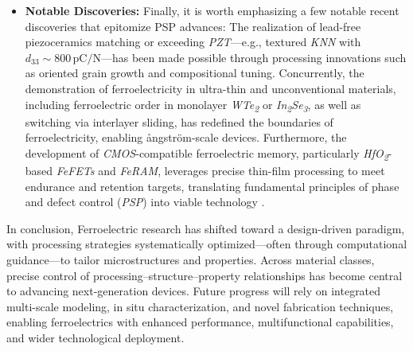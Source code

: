 \documentclass[a4paper,fleqn]{cas-sc}
\begin{document}
\begin{itemize}
\item \textbf{Notable Discoveries:} Finally, it is worth emphasizing a few notable recent discoveries that epitomize PSP advances: The realization of lead-free piezoceramics matching or exceeding \textit{PZT}—e.g., textured \textit{KNN} with $d_{33} \sim 800\,\text{pC/N}$—has been made possible through processing innovations such as oriented grain growth and compositional tuning. Concurrently, the demonstration of ferroelectricity in ultra-thin and unconventional materials, including ferroelectric order in monolayer \textit{WTe\textsubscript{2}} or \textit{In\textsubscript{2}Se\textsubscript{3}}, as well as switching via interlayer sliding, has redefined the boundaries of ferroelectricity, enabling ångström-scale devices. Furthermore, the development of \textit{CMOS}-compatible ferroelectric memory, particularly \textit{HfO\textsubscript{2}}-based \textit{FeFETs} and \textit{FeRAM}, leverages precise thin-film processing to meet endurance and retention targets, translating fundamental principles of phase and defect control (\textit{PSP}) into viable technology \cite{wu2021sliding,shi2023interface,zhu2025ultrahigh}.  
\end{itemize}

\par In conclusion, Ferroelectric research has shifted toward a design-driven paradigm, with processing strategies systematically optimized—often through computational guidance—to tailor microstructures and properties. Across material classes, precise control of processing–structure–property relationships has become central to advancing next-generation devices. Future progress will rely on integrated multi-scale modeling, in situ characterization, and novel fabrication techniques, enabling ferroelectrics with enhanced performance, multifunctional capabilities, and wider technological deployment.
\end{document}
